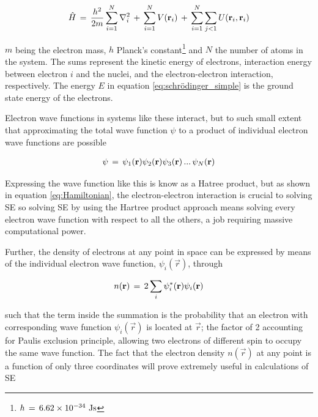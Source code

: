 {\begin{align}
\hat{H}\,=\, \dfrac{h^2}{2m}\sum_{i=1}^{N}\nabla^2_i\,+\, \sum_{i=1}^{N}V(\textbf{r}_i) \,+\, \sum_{i=1}^{N}\sum_{j<1}U(\textbf{r}_i,\textbf{r}_i)
	\label{eq:Hamiltonian}
\end{align}

$m$ being the electron mass, $h$ Planck's constant\footnote{$h\,=\,6.62\times10^{-34}\text{ Js}$} and $N$ the number of atoms in the system. The sums represent the kinetic energy of electrons, interaction energy between electron $i$ and the nuclei, and the electron-electron interaction, respectively. The energy $E$ in equation \ref{eq:schrödinger_simple} is the ground state energy of the electrons.

Electron wave functions in systems like these interact, but to such small extent that approximating the total wave function $\psi$ to a product of individual electron wave functions are possible

\begin{align}
\psi\,=\, \psi_1(\textbf{r})\psi_2(\textbf{r})\psi_3(\textbf{r}) \,...\, \psi_N(\textbf{r})
\end{align}

Expressing the wave function like this is know as a Hatree product, but as shown in equation \ref{eq:Hamiltonian}, the electron-electron interaction is crucial to solving SE so solving SE by using the Hartree product approach means solving every electron wave function with respect to all the others, a job requiring massive computational power.

Further, the density of electrons at any point in space can be expressed by means of the individual electron wave function, $\psi_i(\vec{r})$, through 

\begin{align}
n(\textbf{r})\,=\, 2 \sum_i \psi_i^*(\textbf{r})\psi_i(\textbf{r})
\label{eq:electron_density}
\end{align}

such that the term inside the summation is the probability that an electron with corresponding wave function $\psi_i(\vec{r})$ is located at $\vec{r}$; the factor of 2 accounting for Paulis exclusion principle, allowing two electrons of different spin to occupy the same wave function. The fact that the electron density $n(\vec{r})$ at any point is a function of only three coordinates will prove extremely useful in calculations of SE 


}
